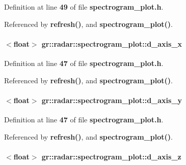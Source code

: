 Definition at line {\bf 49} of file {\bf spectrogram\+\_\+plot.\+h}.



Referenced by {\bf refresh()}, and {\bf spectrogram\+\_\+plot()}.

\paragraph[{d\+\_\+axis\+\_\+x}]{$<$float$>$ gr\+::radar\+::spectrogram\+\_\+plot\+::d\+\_\+axis\+\_\+x\hspace{0.3cm}{\ttfamily [private]}}\label{classgr_1_1radar_1_1spectrogram__plot_a531ce77650b177d6c48c361d7a6185c5}


Definition at line {\bf 47} of file {\bf spectrogram\+\_\+plot.\+h}.



Referenced by {\bf refresh()}, and {\bf spectrogram\+\_\+plot()}.

\paragraph[{d\+\_\+axis\+\_\+y}]{$<$float$>$ gr\+::radar\+::spectrogram\+\_\+plot\+::d\+\_\+axis\+\_\+y\hspace{0.3cm}{\ttfamily [private]}}\label{classgr_1_1radar_1_1spectrogram__plot_ab4677546322f7cd7a6697c6d5bfc5c04}


Definition at line {\bf 47} of file {\bf spectrogram\+\_\+plot.\+h}.



Referenced by {\bf refresh()}, and {\bf spectrogram\+\_\+plot()}.

\paragraph[{d\+\_\+axis\+\_\+z}]{$<$float$>$ gr\+::radar\+::spectrogram\+\_\+plot\+::d\+\_\+axis\+\_\+z\hspace{0.3cm}{\ttfamily [private]}}\label{classgr_1_1radar_1_1spectrogram__plot_ac674ceed2dadbdd704320aadb23a03bc}


